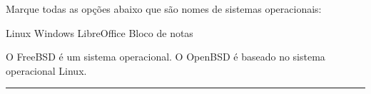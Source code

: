 \documentclass[12pt,addpoints]{exam}
\begin{document}
\begin{questions}
\question[10]
Marque todas as opções abaixo que são nomes de sistemas operacionais:
\begin{checkboxes}
	\correctchoice Linux
	\correctchoice Windows
	\choice LibreOffice
	\choice Bloco de notas
\end{checkboxes}



\question[10] \tf[V] O FreeBSD é um sistema operacional.
\question[10] \tf[F] O OpenBSD é baseado no sistema operacional Linux.




\end{questions}



\vfill
\rule{10cm}{1px}

\vspace{0.5cm}
\gradetable[h]
\end{document}
